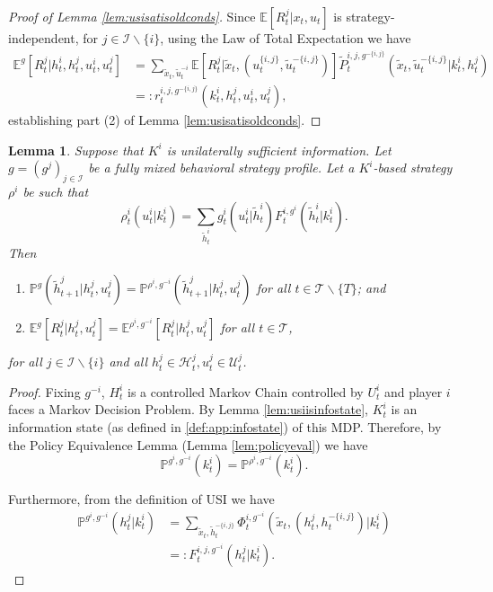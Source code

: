 \documentclass[pdflatex,sn-basic]{sn-jnl}
\newcommand{\E}{\mathbb{E}}
\renewcommand{\Pr}{\mathbb{P}}
\newcommand{\Comp}{K}
\newcommand{\comp}{k}
\theoremstyle{thmstyleone}%
\newtheorem{lemma}{Lemma}
\theoremstyle{thmstyletwo}%
\theoremstyle{thmstylethree}%
\begin{document}
\begin{appendices}
\begin{proof}[Proof of Lemma \ref{lem:usisatisoldconds}]
	Since $\E[R_t^j|x_t, u_t]$ is strategy-independent, for $j\in\mathcal{I}\backslash\{i\}$, {using the Law of Total Expectation we have}
	\begin{align}
		\E^g[R_t^j|h_t^i, h_t^j, u_t^i, u_t^j] &= \sum_{\tilde{x}_t, \tilde{u}_t^{-i}} \E[R_t^j|\tilde{x}_t, (u_t^{\{i, j\}}, \tilde{u}_t^{-\{i, j\}})] \tilde{P}_t^{i, j, g^{-\{i, j\}}}(\tilde{x}_t, \tilde{u}_t^{-\{i, j\}}|\comp_t^i, h_t^j)\\
		&=:r_t^{i, j, g^{-\{i, j\}}}(\comp_t^i, h_t^j, u_t^i, u_t^j),
	\end{align}
	establishing part (2) of Lemma \ref{lem:usisatisoldconds}.
\end{proof}

\begin{lemma}\label{lem:prequiv}
	Suppose that $\Comp^i$ is unilaterally sufficient information. Let $g=(g^j)_{j\in\mathcal{I}}$ be a fully mixed behavioral strategy profile. Let a $\Comp^i$-based strategy $\rho^i$ be such that
	\begin{equation}
		\rho_t^{i}(u_t^i|\comp_t^i) = \sum_{\tilde{h}_t^i}g_t^{ i}(u_t^i|\tilde{h}_t^i)F_t^{i, g^{i}}(\tilde{h}_t^i|\comp_t^i).\label{florida}
	\end{equation}
	Then
	\begin{enumerate}[(1)]
		\item $\Pr^{g}(\tilde{h}_{t+1}^j|h_t^j, u_t^j) = \Pr^{\rho^i, g^{-i}}(\tilde{h}_{t+1}^j|h_t^j, u_t^j)$ for all $t\in\mathcal{T}\backslash\{T\}$; and
		\item $\E^g[R_t^j|h_t^j, u_t^j] = \E^{\rho^i, g^{-i}}[R_t^j|h_t^j, u_t^j]$ for all $t\in\mathcal{T}$,
	\end{enumerate}
	for all $j\in\mathcal{I}\backslash\{i\}$ and all $h_t^j\in \mathcal{H}_t^j, u_t^j\in\mathcal{U}_t^j$.
\end{lemma}

\begin{proof}
	Fixing $g^{-i}$, $H_t^i$ is a controlled Markov Chain controlled by $U_t^i$ and player $i$ faces a Markov Decision Problem. By Lemma \ref{lem:usiisinfostate}, $\Comp_t^i$ is an information state (as defined in \ref{def:app:infostate}) of this MDP. Therefore, by {the Policy Equivalence Lemma (Lemma \ref{lem:policyeval})} we have
	\begin{equation}\label{prgniqt}
		\Pr^{g^{i}, g^{-i}}(\comp_t^i) = \Pr^{\rho^{i}, g^{-i}}(\comp_t^i).
	\end{equation}
	
	Furthermore, {from the definition of USI we have}
	\begin{align}
		\Pr^{g^{i}, g^{-i}}(h_t^j|\comp_t^i) &= \sum_{\tilde{x}_t, \tilde{h}_t^{-\{i, j\} }}\Phi_t^{i,g^{-i}}(\tilde{x}_t, (h_t^j, h_t^{-\{i, j\}})|\comp_t^i)\\
		&=: F_t^{i,j, g^{-i}}(h_t^j|\comp_t^i).
    \end{align}
    

\end{proof}
\end{appendices}
\end{document}
